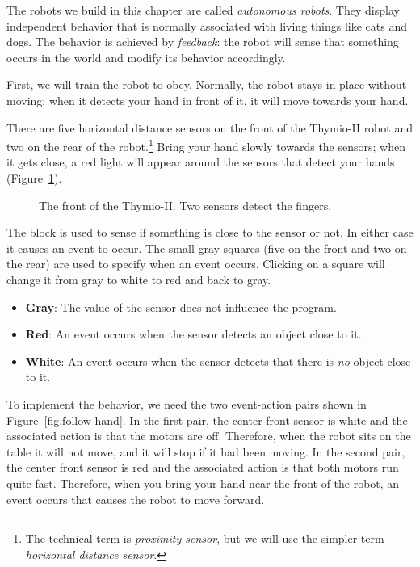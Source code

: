 \label{ch.pet}

The robots we build in this chapter are called \emph{autonomous robots}.
They display independent behavior that is normally associated with
living things like cats and dogs. The behavior is achieved by
\textit{feedback}: the robot will sense that something occurs in the
world and modify its behavior accordingly.


First, we will train the robot to obey. Normally, the robot stays in
place without moving; when it detects your hand in front of it, it will
move towards your hand.

There are five horizontal distance sensors on the front of the Thymio-II
robot and two on the rear of the robot.\footnote{The technical term is
\emph{proximity sensor}, but we will use the simpler term
\emph{horizontal distance sensor}.} Bring your hand slowly towards the
sensors; when it gets close, a red light will appear around the sensors
that detect your hands (Figure~\ref{fig.detect}).

\begin{figure}
\begin{center}
\caption{The front of the Thymio-II. Two sensors detect the fingers.}\label{fig.detect}
\end{center}
\end{figure}

The block  is used to sense if something is close to the
sensor or not. In either case it causes an event to occur. The small
gray squares (five on the front and two on the rear) are used to specify
when an event occurs. Clicking on a square will change it from gray to
white to red and back to gray.

\begin{itemize}
\item \textbf{Gray}: The value of the sensor does not influence the
program.
\item \textbf{Red}: An event occurs when the sensor detects an object
close to it.
\item \textbf{White}: An event occurs when the sensor detects that there
is \emph{no} object close to it.
\end{itemize}

To implement the behavior, we need the two event-action pairs shown in
Figure~\ref{fig.follow-hand}. In the first pair, the center front sensor
is white and the associated action is that the motors are off.
Therefore, when the robot sits on the table it will not move, and it
will stop if it had been moving. In the second pair, the center front
sensor is red and the associated action is that both motors run quite
fast. Therefore, when you bring your hand near the front of the robot,
an event occurs that causes the robot to move forward.

